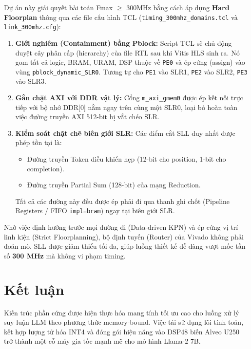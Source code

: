 \documentclass[12pt,a4paper]{article}
\begin{document}
Dự án này giải quyết bài toán Fmax $\geq$ 300MHz bằng cách áp dụng \textbf{Hard Floorplan} thông qua các file cấu hình TCL (\texttt{timing\_300mhz\_domains.tcl} và \texttt{link\_300mhz.cfg}):
\begin{enumerate}
    \item \textbf{Giới nghiêm (Containment) bằng Pblock:} Script TCL sẽ chủ động duyệt cây phân cấp (hierarchy) của file RTL sau khi Vitis HLS sinh ra. Nó gom tất cả logic, BRAM, URAM, DSP thuộc về \texttt{PE0} và ép cứng (assign) vào vùng \texttt{pblock\_dynamic\_SLR0}. Tương tự cho \texttt{PE1} vào SLR1, \texttt{PE2} vào SLR2, \texttt{PE3} vào SLR3.
    \item \textbf{Gắn chặt AXI với DDR vật lý:} Cổng \texttt{m\_axi\_gmem0} được ép kết nối trực tiếp với bộ nhớ DDR[0] nằm ngay trên cùng một SLR0, loại bỏ hoàn toàn việc đường truyền AXI 512-bit bị vắt chéo SLR.
    \item \textbf{Kiểm soát chặt chẽ biên giới SLR:} Các điểm cắt SLL duy nhất được phép tồn tại là:
    \begin{itemize}
        \item Đường truyền Token điều khiển hẹp (12-bit cho position, 1-bit cho completion).
        \item Đường truyền Partial Sum (128-bit) của mạng Reduction. 
    \end{itemize}
    Tất cả các đường này đều được ép phải đi qua thanh ghi chốt (Pipeline Registers / FIFO \texttt{impl=bram}) ngay tại biên giới SLR.
\end{enumerate}
Nhờ việc định hướng trước mọi đường đi (Data-driven KPN) và ép cứng vị trí linh kiện (Strict Floorplanning), bộ định tuyến (Router) của Vivado không phải đoán mò. SLL được giảm thiểu tối đa, giúp luồng thiết kế dễ dàng vượt mốc tần số \textbf{300 MHz} mà không vi phạm timing.

\section{Kết luận}
Kiến trúc phần cứng được hiện thực hóa mang tính tối ưu cao cho luồng xử lý suy luận LLM theo phương thức memory-bound. Việc tái sử dụng lõi tính toán, kết hợp lượng tử hóa INT4 và đóng gói hiệu năng vào DSP48 biến Alveo U250 trở thành một cỗ máy gia tốc mạnh mẽ cho mô hình Llama-2 7B.
\end{document}
